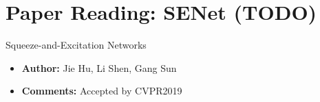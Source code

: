 \section{Paper Reading: SENet (TODO)}


\begin{frame}{Squeeze-and-Excitation Networks}
    \begin{itemize}
        \item \textbf{Author:} Jie Hu, Li Shen, Gang Sun
        \item \textbf{Comments:} Accepted by CVPR2019
    \end{itemize}
\end{frame}
